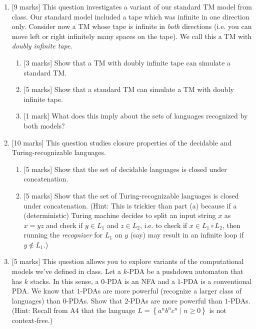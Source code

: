 \documentclass{article}
\newcommand{\set}[1]{{\left\{#1\right\}}}    %
\begin{document}
\begin{enumerate}
    \item {[9 marks]} This question investigates a variant of our standard TM model from class. Our standard model included a tape which was infinite in one direction only. Consider now a TM whose tape is infinite in \emph{both} directions (i.e. you can move left or right infinitely many spaces on the tape). We call this a TM with \emph{doubly infinite tape}.
        \begin{enumerate}
            \item {[3 marks]} Show that a TM with doubly infinite tape can simulate a standard TM.
            \item {[5 marks]} Show that a standard TM can simulate a TM with doubly infinite tape.
            \item {[1 mark]} What does this imply about the sets of languages recognized by both models?
        \end{enumerate}
    \item {[10 marks]} This question studies closure properties of the decidable and Turing-recognizable languages.
        \begin{enumerate}
            \item {[5 marks]} Show that the set of decidable languages is closed under concatenation.
            \item {[5 marks]} Show that the set of Turing-recognizable languages is closed under concatenation. (Hint: This is trickier than part (a) because if a (deterministic) Turing machine decides to split an input string $x$ as $x=yz$ and check if $y\in L_1$ and $z\in L_2$, i.e. to check if $x\in L_1\circ L_2$, then running the \emph{recognizer} for $L_1$ on $y$ (say) may result in an infinite loop if $y\not\in L_1$.)
        \end{enumerate}

    \item {[5 marks]} This question allows you to explore variants of the computational models we've defined in class. Let a $k$-PDA be a pushdown automaton that has $k$ stacks. In this sense, a $0$-PDA is an NFA and a $1$-PDA is a conventional PDA. We know that $1$-PDAs are more powerful (recognize a larger class of languages) than $0$-PDAs. Show that $2$-PDAs are more powerful than $1$-PDAs. (Hint: Recall from A4 that the language $L=\set{a^nb^nc^n\mid n\geq 0}$ is not context-free.)

\end{enumerate}
\end{document}
